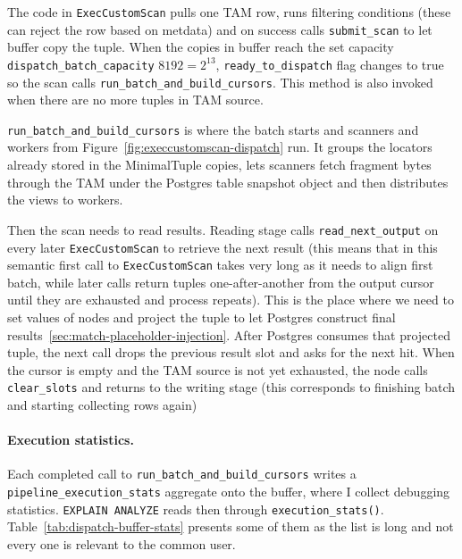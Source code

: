 The code in \texttt{ExecCustomScan} pulls one TAM row, runs filtering conditions (these can reject the row based on metdata) and on success calls \texttt{submit\_scan} to let buffer copy the tuple.
When the copies in buffer reach the set capacity \texttt{dispatch\_batch\_capacity} \(8192 = 2^{13}\), \texttt{ready\_to\_dispatch} flag changes to true so the scan calls \texttt{run\_batch\_and\_build\_cursors}.
This method is also invoked when there are no more tuples in TAM source.

\texttt{run\_batch\_and\_build\_cursors} is where the batch starts and scanners and workers from Figure~\ref{fig:execcustomscan-dispatch} run.
It groups the locators already stored in the MinimalTuple copies, lets scanners fetch fragment bytes through the TAM under the Postgres table snapshot object and then distributes the views to workers.

Then the scan needs to read results. Reading stage calls \texttt{read\_next\_output} on every later \texttt{ExecCustomScan} to retrieve the next result (this means that in this semantic first call to \texttt{ExecCustomScan} takes very long as it needs to align first batch, while later calls return tuples one-after-another from the output cursor until they are exhausted and process repeats).
This is the place where we need to set values of nodes and project the tuple to let Postgres construct final results~\ref{sec:match-placeholder-injection}.
After Postgres consumes that projected tuple, the next call drops the previous result slot and asks for the next hit.
When the cursor is empty and the TAM source is not yet exhausted, the node calls \texttt{clear\_slots} and returns to the writing stage (this corresponds to finishing batch and starting collecting rows again)

\paragraph{Execution statistics.}
Each completed call to \texttt{run\_batch\_and\_build\_cursors} writes a \texttt{pipeline\_execution\_stats} aggregate onto the buffer, where I collect debugging statistics. 
\texttt{EXPLAIN ANALYZE} reads then through \texttt{execution\_stats()}.
Table~\ref{tab:dispatch-buffer-stats} presents some of them as the list is long and not every one is relevant to the common user.

